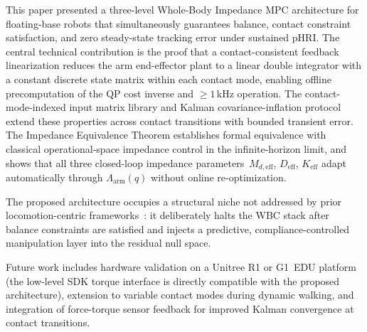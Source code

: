 \documentclass[journal]{IEEEtran}
\newcommand{\Larm}{\Lambda_{\text{arm}}}
\begin{document}
This paper presented a three-level Whole-Body Impedance MPC architecture
for floating-base robots that simultaneously guarantees balance, contact
constraint satisfaction, and zero steady-state tracking error under
sustained pHRI.
The central technical contribution is the proof that a contact-consistent
feedback linearization reduces the arm end-effector plant to a linear double
integrator with a constant discrete state matrix within each contact mode,
enabling offline precomputation of the QP cost inverse and ${\geq}1$\,kHz
operation.
The contact-mode-indexed input matrix library and Kalman covariance-inflation
protocol extend these properties across contact transitions with bounded
transient error.
The Impedance Equivalence Theorem establishes formal equivalence with
classical operational-space impedance control in the infinite-horizon limit,
and shows that all three closed-loop impedance parameters~$M_{d,\text{eff}}$,
$D_{\text{eff}}$, $K_{\text{eff}}$ adapt automatically through
$\Larm(q)$ without online re-optimization.

The proposed architecture occupies a structural niche not addressed by prior
locomotion-centric frameworks~\cite{dicarlo2018dynamic,kim2019highly,bellicoso2016perception,koolen2016design}:
it deliberately halts the WBC stack after balance constraints are satisfied
and injects a predictive, compliance-controlled manipulation layer into the
residual null space.

Future work includes hardware validation on a Unitree R1 or G1~EDU platform
(the low-level SDK torque interface is directly compatible with the proposed
architecture), extension to variable contact modes during dynamic walking,
and integration of force-torque sensor feedback for improved Kalman
convergence at contact transitions.



\end{document}
